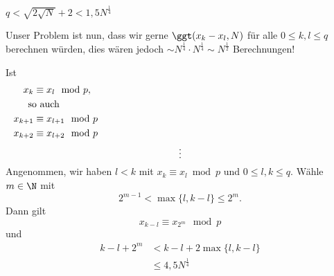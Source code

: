 \begin{rem*}
	$q < \sqrt{2\sqrt{N}} + 2 < 1,5 N^{\frac{1}{4}}$
\end{rem*}

Unser Problem ist nun, dass wir gerne $\ggt(x_k-x_l,N)$ für alle $0\leq k, l \leq q$ berechnen würden, dies wären jedoch $\sim N^{\frac{1}{4}} \cdot N^{\frac{1}{4}} \sim N^{\frac{1}{2}}$ Berechnungen!

\begin{idee*}
	Ist 
	\begin{align*}
		x_k &\equiv x_l \mod p, \\
		\noalign{so auch}
		x_{k+1} &\equiv x_{l+1} \mod p\\
		x_{k+2} &\equiv x_{l+2} \mod p\\
		\noalign{\centering $\vdots$}
	\end{align*}
	Angenommen, wir haben $l < k$ mit $x_k \equiv x_l \bmod p$ und $0 \leq l, k \leq q$. Wähle $m \in \N$ mit 
	\[ 2^{m-1} < \max\{l,k-l\} \leq 2^m. \]
	Dann gilt
	\[ x_{k-l} \equiv x_{2^m} \mod p \]
	und 
	\begin{align*}
		k-l + 2^m &< k-l + 2\max\{l,k-l\}\\
		&\leq 4,5 N^{\frac{1}{4}}
	\end{align*}
\end{idee*}